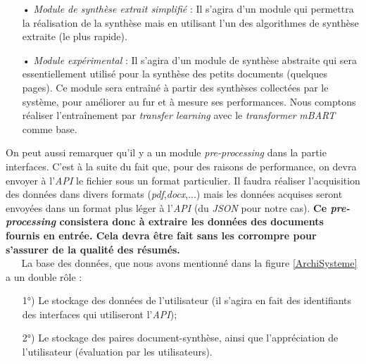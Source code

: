 \begin{itemize}
\item[•] \textit{Module de synthèse extrait simplifié} : Il s'agira d'un module qui permettra la réalisation de la synthèse mais en utilisant l'un des algorithmes de synthèse extraite (le plus rapide).
\item[•] \textit{Module expérimental} : Il s'agira d'un module de synthèse abstraite qui sera es\-sen\-tiel\-le\-ment utilisé pour la synthèse des petits documents (quelques pages). Ce module sera entraîné à partir des synthèses collectées par le système, pour améliorer au fur et à mesure ses performances. Nous comptons réaliser l'entraînement par \textit{transfer learning} avec le \textit{transformer} \textit{mBART} \cite{mBART_liu2020multilingual} comme base. 
\end{itemize}
On peut aussi remarquer qu'il y a un module \textit{pre-processing} dans la partie interfaces. C'est à la suite du fait que, pour des raisons de performance, on devra envoyer à l'\textit{API} le fichier sous un format particulier. Il faudra réaliser l'acquisition des données dans divers formats (\textit{pdf},\textit{docx},...) mais les données acquises seront envoyées dans un format plus léger à l'\textit{API} (du \textit{JSON} pour notre cas). \textbf{Ce \textit{pre-processing} consistera donc à extraire les données des documents fournis en entrée. Cela devra être fait sans les corrompre pour s'assurer de la qualité des résumés.}\\
$ _{} $ $ _{} $ $ _{} $ $ _{} $ $ _{} $La base des données, que nous avons mentionné dans la figure \ref{ArchiSysteme} a un double rôle :
\begin{itemize}
\item[1°)] Le stockage des données de l'utilisateur (il s'agira en fait des identifiants des in\-ter\-fa\-ces qui utiliseront l'\textit{API});
\item[2°)] Le stockage des paires document-synthèse, ainsi que l'appréciation de l'utilisateur (évaluation par les utilisateurs).
\end{itemize}
